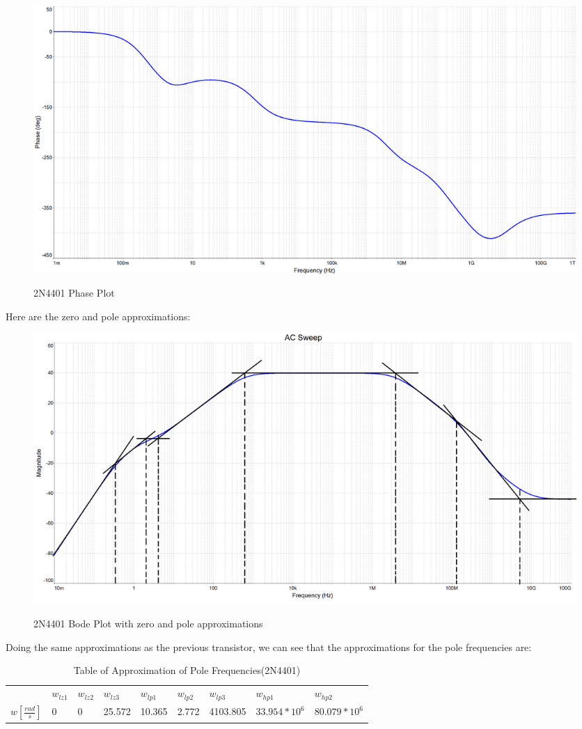 \documentclass[12pt]{article}
\begin{document}
\begin{figure}[H]
\centering
\includegraphics[height=0.45\textwidth]{Images/2a_2N4401_phase.png}\\
\caption{2N4401 Phase Plot}
\label{fig:part2a_phase_plot_2N4401}
\end{figure}

Here are the zero and pole approximations:

\begin{figure}[H]
\centering
\includegraphics[height=0.45\textwidth]{Images/2abode_approximations_2N4401.png}\\
\caption{2N4401 Bode Plot with zero and pole approximations}
\label{fig:part2a_bodeplot_approximations_2N4401}
\end{figure}

Doing the same approximations as the previous transistor, we can see that the approximations for the pole frequencies are:
\begin{table}[h!]
\centering
\begin{tabular}{|l|l|l|l|l|l|l|l|l|}
\cline{1-2} \cline{3-9}
             & $w_{lz1}$ & $w_{lz2}$ & $w_{lz3}$ & $w_{lp1}$  & $w_{lp2}$  & $w_{lp3}$     & $w_{hp1}$          & $w_{hp2}$           \\ \cline{1-2} \cline{3-9}
$w[\frac{rad}{s}]$ &  0    & 0     & 25.572      & 10.365 & 2.772 & 4103.805 & $33.954*10^6$ & $80.079*10^6$ \\
\hline
\end{tabular}
\caption{Table of Approximation of Pole Frequencies(2N4401)}
\label{table:2N4401_Approximation_Poles}
\end{table}
\end{document}
